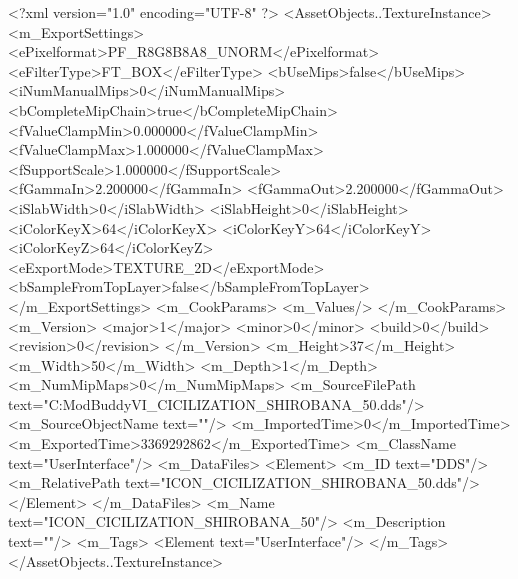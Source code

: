 <?xml version="1.0" encoding="UTF-8" ?>
<AssetObjects..TextureInstance>
	<m_ExportSettings>
		<ePixelformat>PF_R8G8B8A8_UNORM</ePixelformat>
		<eFilterType>FT_BOX</eFilterType>
		<bUseMips>false</bUseMips>
		<iNumManualMips>0</iNumManualMips>
		<bCompleteMipChain>true</bCompleteMipChain>
		<fValueClampMin>0.000000</fValueClampMin>
		<fValueClampMax>1.000000</fValueClampMax>
		<fSupportScale>1.000000</fSupportScale>
		<fGammaIn>2.200000</fGammaIn>
		<fGammaOut>2.200000</fGammaOut>
		<iSlabWidth>0</iSlabWidth>
		<iSlabHeight>0</iSlabHeight>
		<iColorKeyX>64</iColorKeyX>
		<iColorKeyY>64</iColorKeyY>
		<iColorKeyZ>64</iColorKeyZ>
		<eExportMode>TEXTURE_2D</eExportMode>
		<bSampleFromTopLayer>false</bSampleFromTopLayer>
	</m_ExportSettings>
	<m_CookParams>
		<m_Values/>
	</m_CookParams>
	<m_Version>
		<major>1</major>
		<minor>0</minor>
		<build>0</build>
		<revision>0</revision>
	</m_Version>
	<m_Height>37</m_Height>
	<m_Width>50</m_Width>
	<m_Depth>1</m_Depth>
	<m_NumMipMaps>0</m_NumMipMaps>
	<m_SourceFilePath text="C:\Users\asus\Documents\Firaxis ModBuddy\Civilization VI\temppic\ICON_CICILIZATION_SHIROBANA_50.dds"/>
	<m_SourceObjectName text=""/>
	<m_ImportedTime>0</m_ImportedTime>
	<m_ExportedTime>3369292862</m_ExportedTime>
	<m_ClassName text="UserInterface"/>
	<m_DataFiles>
		<Element>
			<m_ID text="DDS"/>
			<m_RelativePath text="ICON_CICILIZATION_SHIROBANA_50.dds"/>
		</Element>
	</m_DataFiles>
	<m_Name text="ICON_CICILIZATION_SHIROBANA_50"/>
	<m_Description text=""/>
	<m_Tags>
		<Element text="UserInterface"/>
	</m_Tags>
</AssetObjects..TextureInstance>

